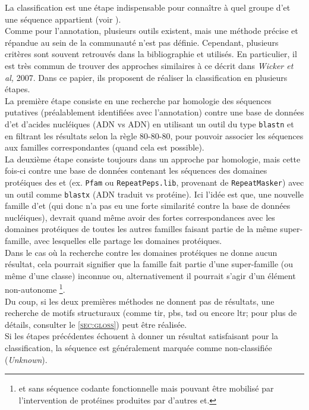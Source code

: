 \documentclass[10pt]{article}
\begin{document}
La classification est une étape indispensable pour connaître à quel groupe d'\acrlong{et} une séquence appartient (voir \figureautorefname{ \ref{fig:classif_et}}). \\
Comme pour l'annotation, plusieurs outils existent, mais une méthode précise et répandue au sein de la communauté n'est pas définie. Cependant, plusieurs critères sont souvent retrouvés dans la bibliographie et utilisés. En particulier, il est très commun de trouver des approches similaires à ce décrit dans \textit{Wicker et al,} 2007. Dans ce papier, ils proposent de réaliser la classification en plusieurs étapes. \\
La première étape consiste en une recherche par homologie des séquences putatives (préalablement identifiées avec l'annotation) contre une base de données d'\acrshort{et} d'acides nucléiques (ADN vs ADN) en utilisant un outil du type \texttt{blastn} et en filtrant les résultats selon la règle 80-80-80, pour pouvoir associer les séquences aux familles correspondantes (quand cela est possible). \\
La deuxième étape consiste toujours dans un approche par homologie, mais cette fois-ci contre une base de données contenant les séquences des domaines protéiques des \acrlong{et} (ex. \texttt{Pfam} ou \texttt{RepeatPeps.lib}, provenant de \texttt{RepeatMasker}) avec un outil comme \texttt{blastx} (ADN traduit vs protéine). Ici l'idée est que, une nouvelle famille d'\acrshort{et} (qui donc n'a pas eu une forte similarité contre la base de données nucléiques), devrait quand même avoir des fortes correspondances avec les domaines protéiques de toutes les autres familles faisant partie de la même super-famille, avec lesquelles elle partage les domaines protéiques. \\
Dans le cas où la recherche contre les domaines protéiques ne donne aucun résultat, cela pourrait signifier que la famille fait partie d'une super-famille (ou même d'une classe) inconnue ou, alternativement il pourrait s'agir d'un élément non-autonome \footnote{\acrshort{et} sans séquence codante fonctionnelle mais pouvant être mobilisé par l'intervention de protéines produites par d'autres \acrshort{et}.}. \\
Du coup, si les deux premières méthodes ne donnent pas de résultats, une recherche de motifs structuraux (comme \acrshort{tir}, \acrshort{pbs}, \acrshort{tsd} ou encore \acrshort{ltr}; pour plus de détails, consulter le \textsc{\ref{sec:gloss}}) peut être réalisée. \\
Si les étapes précédentes échouent à donner un résultat satisfaisant pour la classification, la séquence est généralement marquée comme non-classifiée (\textit{Unknown}).
\end{document}
